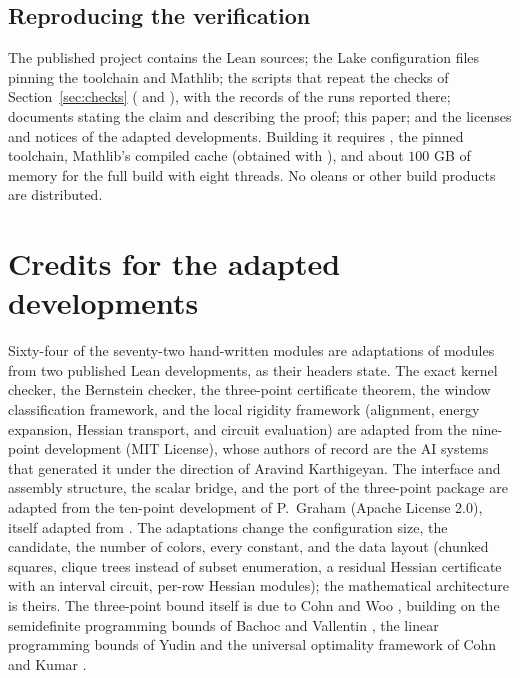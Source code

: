 \documentclass[11pt]{amsart}
\theoremstyle{definition}
\theoremstyle{remark}
\begin{document}
\subsection{Reproducing the verification}

The published project contains the Lean sources; the Lake configuration files pinning the toolchain and Mathlib; the scripts that repeat the checks of Section~\ref{sec:checks} ( and ), with the records of the runs reported there; documents stating the claim and describing the proof; this paper; and the licenses and notices of the adapted developments. Building it requires , the pinned toolchain, Mathlib's compiled cache (obtained with ), and about $100$ GB of memory for the full build with eight threads. No oleans or other build products are distributed.

\section{Credits for the adapted developments}\label{sec:credits}

Sixty-four of the seventy-two hand-written modules are adaptations of modules from two published Lean developments, as their headers state. The exact kernel checker, the Bernstein checker, the three-point certificate theorem, the window classification framework, and the local rigidity framework (alignment, energy expansion, Hessian transport, and circuit evaluation) are adapted from the nine-point development \cite{ThomsonN9} (MIT License), whose authors of record are the AI systems that generated it under the direction of Aravind Karthigeyan. The interface and assembly structure, the scalar bridge, and the port of the three-point package are adapted from the ten-point development of P.~Graham \cite{GrahamThomson102026} (Apache License 2.0), itself adapted from \cite{ThomsonN9}. The adaptations change the configuration size, the candidate, the number of colors, every constant, and the data layout (chunked squares, clique trees instead of subset enumeration, a residual Hessian certificate with an interval circuit, per-row Hessian modules); the mathematical architecture is theirs. The three-point bound itself is due to Cohn and Woo \cite{CohnWoo2012}, building on the semidefinite programming bounds of Bachoc and Vallentin \cite{BachocVallentin2008}, the linear programming bounds of Yudin \cite{Yudin1993} and the universal optimality framework of Cohn and Kumar \cite{CohnKumar2007}.
\end{document}
